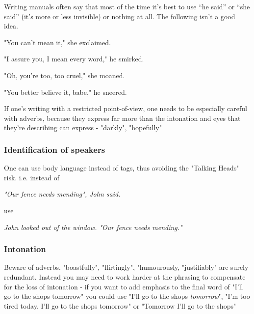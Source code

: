 \documentclass[11pt]{article}
\newenvironment{narrow}[2]{%
 \begin{list}{}{%
  \setlength{\topsep}{0pt}%
  \setlength{\leftmargin}{#1}%
  \setlength{\rightmargin}{#2}%
  \setlength{\listparindent}{\parindent}%
  \setlength{\itemindent}{\parindent}%
  \setlength{\parsep}{\parskip}%
 }%
\item[]}{\end{list}}
\begin{document}
Writing manuals often say that most of the time it's best to use “he said” or “she said” (it's more or less invisible) or nothing at all. The following isn't a good idea.


\begin{narrow}{1.0cm}{1.0cm}
"You can’t mean it," she exclaimed.

"I assure you, I mean every word," he smirked.

"Oh, you’re too, too cruel," she moaned.

"You better believe it, babe," he sneered.
\end{narrow}
If one's writing with a restricted point-of-view, one needs to be especially careful with adverbs, because they express far more than the intonation and eyes that they're describing can express - "darkly", "hopefully"



\subsubsection*{Identification of speakers}
One can use body language instead of tags, thus avoiding the "Talking Heads" risk. i.e. instead of
\begin{narrow}{1.0cm}{1.0cm}
 \textit{"Our fence needs mending", John said.} 
\end{narrow}
use

\begin{narrow}{1.0cm}{1.0cm}
 \textit{John looked out of the window. "Our fence needs mending."}
\end{narrow}

\subsubsection*{Intonation}
Beware of adverbs. "boastfully", "flirtingly", "humourously, "justifiably" are surely redundant. Instead you may need to work harder at the phrasing to compensate for the loss of intonation - if you want to add emphasis to the final word of "I'll go to the shops tomorrow" you could use "I'll go to the shops \textit{tomorrow}", "I'm too tired today. I'll go to the shops tomorrow" or "Tomorrow I'll go to the shops"
\end{document}
